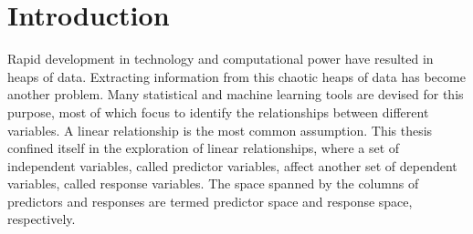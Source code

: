 \documentclass[11pt,twoside,openright,titlepage,
  headinclude,footinclude,BCOR=5mm,
  numbers=noenddot,cleardoublepage=empty,
  tablecaptionabove, dottedtoc,
  bibliography=totoc,paper=a4]{scrreprt}
\begin{document}
\begingroup
\cleardoublepage
{}

\endgroup

\begingroup
\cleardoublepage
{}

\endgroup


\cleardoublepage
{}
{}
\setcounter{tocdepth}{1}
\begingroup 
  \let\clearpage\relax
  \let\cleardoublepage\relax
    \tableofcontents
\endgroup
\markboth{\spacedlowsmallcaps{\contentsname}}
{\spacedlowsmallcaps{\contentsname}} 

\begingroup

\setcounter{secnumdepth}{-\maxdimen} %

\listoffigures
\vfill
\endgroup

\begingroup 
  \let\clearpage\relax
  \let\cleardoublepage\relax
\endgroup

\cleardoublepage



\pagestyle{scrheadings} 

\hypertarget{introduction}{%
\chapter{Introduction}\label{introduction}}

Rapid development in technology and computational power have resulted in heaps of data. Extracting information from this chaotic heaps of data has become another problem. Many statistical and machine learning tools are devised for this purpose, most of which focus to identify the relationships between different variables. A linear relationship is the most common assumption. This thesis confined itself in the exploration of linear relationships, where a set of independent variables, called predictor variables, affect another set of dependent variables, called response variables. The space spanned by the columns of predictors and responses are termed predictor space and response space, respectively.
\end{document}
